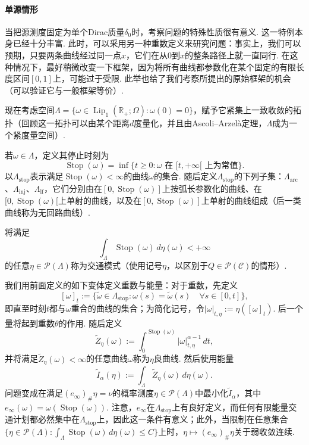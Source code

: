 \paragraph{单源情形}
当把源测度固定为单个Dirac质量$\delta_0$时，考察问题的特殊性质很有意义. 这一特例本身已经十分丰富. 此时，可以采用另一种重数定义来研究问题：事实上，我们可以预期，只要两条曲线经过同一点$x$，它们在从$0$到$x$的整条路径上就一直同行. 在这种情况下，最好稍微改变一下框架，因为将所有曲线都参数化在某个固定的有限长度区间$[0,1]$上，可能过于受限. 此举也给了我们考察\cite{b221}所提出的原始框架的机会（可以验证它与一般框架等价）.

现在考虑空间$\Lambda=\{\omega\in\operatorname{Lip}_1(\mathbb R_+;\Omega):\omega(0)=0\}$，赋予它紧集上一致收敛的拓扑（回顾这一拓扑可以由某个距离$d$度量化，并且由Ascoli--Arzelà定理，$\Lambda$成为一个紧度量空间）.

若$\omega\in\Lambda$，定义其停止时刻为
\[
 \operatorname{Stop}(\omega)=\inf\{t\geq0:\omega\text{ 在 }[t,+\infty[\text{ 上为常值}\}.
\]
以$\Lambda_{\mathrm{stop}}$表示满足$\operatorname{Stop}(\omega)<\infty$的曲线$\omega$的集合. 随后定义$\Lambda_{\mathrm{stop}}$的下列子集：$\Lambda_{\mathrm{arc}}$、$\Lambda_{\mathrm{inj}}$、$\Lambda_{\mathrm{lf}}$，它们分别由在$[0,\operatorname{Stop}(\omega)]$上按弧长参数化的曲线、在$[0,\operatorname{Stop}(\omega)[$上单射的曲线，以及在$[0,\operatorname{Stop}(\omega)]$上单射的曲线组成（后一类曲线称为无回路曲线）.

将满足
\[
 \int_\Lambda\operatorname{Stop}(\omega)\,d\eta(\omega)<+\infty
\]
的任意$\eta\in\mathscr P(\Lambda)$称为交通模式（使用记号$\eta$，以区别于$Q\in\mathscr P(\mathscr C)$的情形）.

我们用前面定义的如下变体定义重数与能量：对于重数，先定义
\[
 [\omega]_t:=\{\widetilde\omega\in\Lambda_{\mathrm{stop}}:
       \omega(s)=\widetilde\omega(s)\quad\forall s\in[0,t]\},
\]
即直至时刻$t$都与$\omega$重合的曲线的集合；为简化记号，令$|\omega|_{t,\eta}:=\eta([\omega]_t)$. 后一个量将起到重数$\theta$的作用. 随后定义
\[
 \widetilde Z_\eta(\omega):=\int_0^{\operatorname{Stop}(\omega)}
                   |\omega|_{t,\eta}^{\alpha-1}\,dt,
\]
并将满足$\widetilde Z_\eta(\omega)<\infty$的任意曲线$\omega$称为$\eta$良曲线. 然后使用能量
\[
 \widetilde I_\alpha(\eta):=\int_\Lambda\widetilde Z_\eta(\omega)\,d\eta(\omega).
\]
问题变成在满足$(e_\infty)_\#\eta=\nu$的概率测度$\eta\in\mathscr P(\Lambda)$中最小化$\widetilde I_\alpha$，其中$e_\infty(\omega)=\omega(\operatorname{Stop}(\omega))$. 注意，$e_\infty$在$\Lambda_{\mathrm{stop}}$上有良好定义，而任何有限能量交通计划都必然集中在$\Lambda_{\mathrm{stop}}$上，因此这一条件有意义；此外，当限制在任意集合$\{\eta\in\mathscr P(\Lambda):\int_\Lambda\operatorname{Stop}(\omega)\,d\eta(\omega)\leq C\}$上时，$\eta\mapsto(e_\infty)_\#\eta$关于弱收敛连续.

